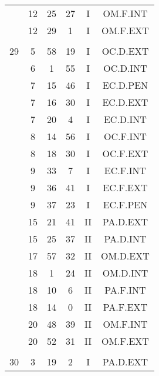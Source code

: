 \documentclass[12pt, a4paper]{article}
\begin{document}
\begin{multicols}{3}
{\begin{tabular}{c c c c c c}
	 	 	 	 & 12 & 25 & 27 & I & OM.F.INT\\%
	 	 	 	 & 12 & 29 & 1 & I & OM.F.EXT\\%
	 	 	 	 & & & & & \\%
	 	 	 	29 & 5 & 58 & 19 & I & OC.D.EXT\\%
	 	 	 	 & 6 & 1 & 55 & I & OC.D.INT\\%
	 	 	 	 & 7 & 15 & 46 & I & EC.D.PEN\\%
	 	 	 	 & 7 & 16 & 30 & I & EC.D.EXT\\%
	 	 	 	 & 7 & 20 & 4 & I & EC.D.INT\\%
	 	 	 	 & 8 & 14 & 56 & I & OC.F.INT\\%
	 	 	 	 & 8 & 18 & 30 & I & OC.F.EXT\\%
	 	 	 	 & 9 & 33 & 7 & I & EC.F.INT\\%
	 	 	 	 & 9 & 36 & 41 & I & EC.F.EXT\\%
	 	 	 	 & 9 & 37 & 23 & I & EC.F.PEN\\%
	 	 	 	 & 15 & 21 & 41 & II & PA.D.EXT\\%
	 	 	 	 & 15 & 25 & 37 & II & PA.D.INT\\%
	 	 	 	 & 17 & 57 & 32 & II & OM.D.EXT\\%
	 	 	 	 & 18 & 1 & 24 & II & OM.D.INT\\%
	 	 	 	 & 18 & 10 & 6 & II & PA.F.INT\\%
	 	 	 	 & 18 & 14 & 0 & II & PA.F.EXT\\%
	 	 	 	 & 20 & 48 & 39 & II & OM.F.INT\\%
	 	 	 	 & 20 & 52 & 31 & II & OM.F.EXT\\%
	 	 	 	 & & & & & \\%
	 	 	 	30 & 3 & 19 & 2 & I & PA.D.EXT\\%

\end{tabular}}
\end{multicols}
\end{document}

